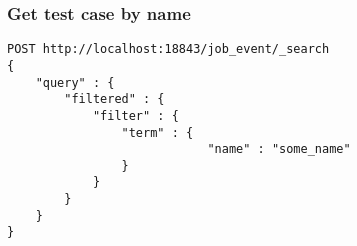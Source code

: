 \label{q:gettcbynameEs}
\begin{figure}[H]
\subsubsection*{Get test case by name}
\begin{mdframed}
\begin{verbatim}
POST http://localhost:18843/job_event/_search
{
    "query" : {
        "filtered" : {
            "filter" : {
                "term" : {
                            "name" : "some_name"
                }
            }
        }
    }
}
\end{verbatim}
\end{mdframed}
\end{figure}
